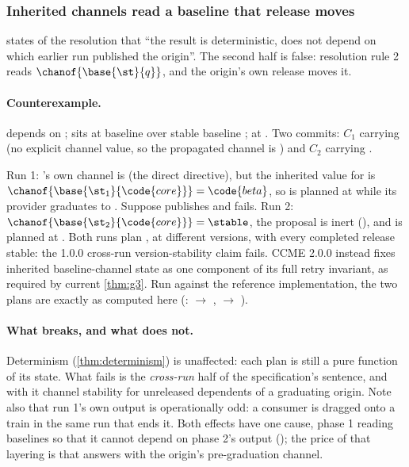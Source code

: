 \subsubsection{Inherited channels read a baseline that release moves}

\begin{obligation}
\label{ob:origin}
 states of the  resolution that ``the result is
deterministic, does not depend on which earlier run published the origin''.
The second half is false: resolution rule 2 reads
$\chanof{\base{\st}{q}}$, and the origin's own release moves it.
\end{obligation}

\paragraph{Counterexample.}  depends on ; 
sits at baseline  over stable baseline ;
 at . Two commits: $C_1$ carrying
 (no explicit channel value, so the propagated
channel is ) and $C_2$ carrying
.

Run 1: 's own channel is \stable{} (the direct directive), but
the inherited value for  is
$\chanof{\base{\st_1}{\code{core}}} = \code{beta}$, so  is
planned at  while its provider graduates to
. Suppose  publishes and  fails. Run 2:
$\chanof{\base{\st_2}{\code{core}}} = \stable$, the proposal is inert
(), and  is planned at . Both runs plan
, at different versions, with every completed release stable:
the 1.0.0 cross-run version-stability claim fails. CCME 2.0.0 instead fixes inherited baseline-channel state as one component of its full retry invariant, as required by current \cref{thm:g3}. Run against the reference implementation, the two
plans are exactly as computed here (: 
$\rightarrow$ ,  $\rightarrow$
).

\paragraph{What breaks, and what does not.} Determinism
(\cref{thm:determinism}) is unaffected: each plan is still a pure function
of its state. What fails is the \emph{cross-run} half of the specification's
sentence, and with it channel stability for unreleased dependents of a
graduating origin. Note also that run 1's own output is operationally odd:
a consumer is dragged onto a train in the same run that ends it. Both
effects have one cause, phase 1 reading baselines so that it cannot depend
on phase 2's output (); the price of that layering is that
 answers with the origin's pre-graduation channel.

